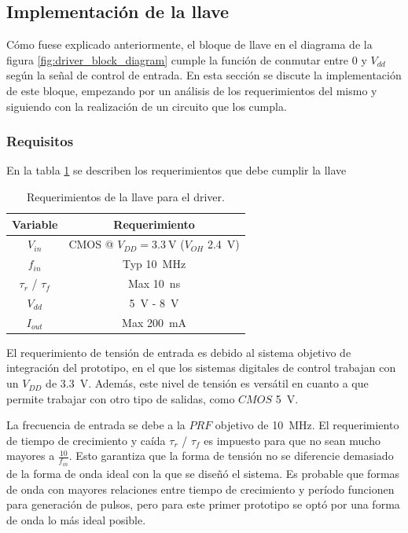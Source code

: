 \subsection{Implementación de la llave}

Cómo fuese explicado anteriormente, el bloque de llave en el diagrama de la
figura \ref{fig:driver_block_diagram} cumple la función de conmutar entre $0$ y
$V_{dd}$ según la señal de control de entrada. En esta sección se discute la
implementación de este bloque, empezando por un análisis de los requerimientos
del mismo y siguiendo con la realización de un circuito que los cumpla.

\subsubsection{Requisitos}

En la tabla
\ref{tab:llave_requirements} se describen los requerimientos que debe cumplir la
llave

\begin{table}
\centering
\begin{tabular}{c|c}
\hline
    Variable & Requerimiento \\
\hline
    $V_{in}$                &   CMOS @ $V_{DD}=\qty{3.3}{\volt}$ ($V_{OH}$
    \qty{2.4}{\volt})     \\
    $f_{in}$                &   Typ \qty{10}{\mega\hertz} \\
    $\tau_{r}$ / $\tau_{f}$ &   Max \qty{10}{\nano\second} \\
    $V_{dd}$                &   \qty{5}{\volt} - \qty{8}{\volt} \\
    $I_{out}$               &   Max \qty{200}{\milli\ampere} \\
\hline
\end{tabular}
\caption{Requerimientos de la llave para el driver.}
\label{tab:llave_requirements}
\end{table}

El requerimiento de tensión de entrada es debido al sistema objetivo de
integración del prototipo, en el que los sistemas digitales de control trabajan
con un $V_{DD}$ de \qty{3.3}{\volt}. Además, este nivel de tensión es versátil
en cuanto a que permite trabajar con otro tipo de salidas, como $CMOS$
\qty{5}{\volt}.

La frecuencia de  entrada se debe a la $PRF$ objetivo de \qty{10}{\mega\hertz}.
El requerimiento de tiempo de crecimiento y caída $\tau_{r}$ / $\tau_{f}$ es
impuesto para que no sean mucho mayores a $\frac{10}{f_{in}}$. Esto garantiza
que la forma de tensión no se diferencie demasiado de la forma de onda ideal con
la que se diseñó el sistema. Es probable que formas de onda con mayores
relaciones entre tiempo de crecimiento y período funcionen para generación de
pulsos, pero para este primer prototipo se optó por una forma de onda lo más
ideal posible.

